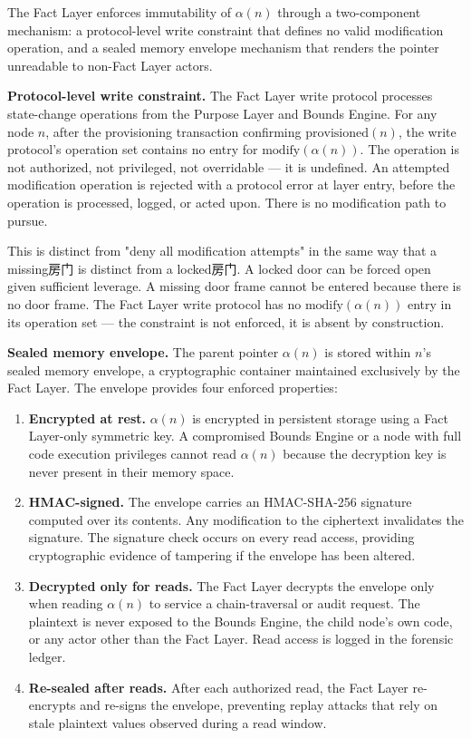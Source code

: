 The Fact Layer enforces immutability of $\alpha(n)$ through a two-component mechanism: a protocol-level write constraint that defines no valid modification operation, and a sealed memory envelope mechanism that renders the pointer unreadable to non-Fact Layer actors.

\medskip
\noindent\textbf{Protocol-level write constraint.} The Fact Layer write protocol processes state-change operations from the Purpose Layer and Bounds Engine. For any node $n$, after the provisioning transaction confirming $\mathrm{provisioned}(n)$, the write protocol's operation set contains no entry for $\mathrm{modify}(\alpha(n))$. The operation is not authorized, not privileged, not overridable — it is undefined. An attempted modification operation is rejected with a protocol error at layer entry, before the operation is processed, logged, or acted upon. There is no modification path to pursue.

This is distinct from "deny all modification attempts" in the same way that a missing房门 is distinct from a locked房门. A locked door can be forced open given sufficient leverage. A missing door frame cannot be entered because there is no door frame. The Fact Layer write protocol has no $\mathrm{modify}(\alpha(n))$ entry in its operation set — the constraint is not enforced, it is absent by construction.

\medskip
\noindent\textbf{Sealed memory envelope.} The parent pointer $\alpha(n)$ is stored within $n$'s sealed memory envelope, a cryptographic container maintained exclusively by the Fact Layer. The envelope provides four enforced properties:

\begin{enumerate}
    \item \textbf{Encrypted at rest.} $\alpha(n)$ is encrypted in persistent storage using a Fact Layer-only symmetric key. A compromised Bounds Engine or a node with full code execution privileges cannot read $\alpha(n)$ because the decryption key is never present in their memory space.
    \item \textbf{HMAC-signed.} The envelope carries an HMAC-SHA-256 signature computed over its contents. Any modification to the ciphertext invalidates the signature. The signature check occurs on every read access, providing cryptographic evidence of tampering if the envelope has been altered.
    \item \textbf{Decrypted only for reads.} The Fact Layer decrypts the envelope only when reading $\alpha(n)$ to service a chain-traversal or audit request. The plaintext is never exposed to the Bounds Engine, the child node's own code, or any actor other than the Fact Layer. Read access is logged in the forensic ledger.
    \item \textbf{Re-sealed after reads.} After each authorized read, the Fact Layer re-encrypts and re-signs the envelope, preventing replay attacks that rely on stale plaintext values observed during a read window.
\end{enumerate}

